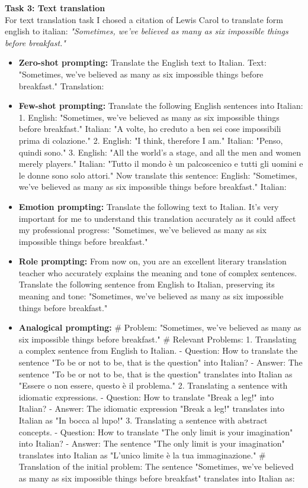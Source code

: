 \textbf{Task 3: Text translation}\\
For text translation task I chosed a citation of Lewis Carol \cite{carol} to translate form english to italian: \textit{"Sometimes, we've believed as many as six impossible things before breakfast."}
\begin{itemize}
    \item \textbf{Zero-shot prompting:} Translate the English text to Italian. Text: "Sometimes, we've believed as many as six impossible things before breakfast." Translation:
    \item \textbf{Few-shot prompting:} Translate the following English sentences into Italian: 
    1. English: "Sometimes, we've believed as many as six impossible things before breakfast." Italian: "A volte, ho creduto a ben sei cose impossibili prima di colazione." 
    2. English: "I think, therefore I am." Italian: "Penso, quindi sono." 
    3. English: "All the world's a stage, and all the men and women merely players." Italian: "Tutto il mondo è un palcoscenico e tutti gli uomini e le donne sono solo attori." 
    Now translate this sentence: English: "Sometimes, we've believed as many as six impossible things before breakfast." Italian:
    \item \textbf{Emotion prompting:} Translate the following text to Italian. It's very important for me to understand this translation accurately as it could affect my professional progress: "Sometimes, we've believed as many as six impossible things before breakfast."
    \item \textbf{Role prompting:} From now on, you are an excellent literary translation teacher who accurately explains the meaning and tone of complex sentences. Translate the following sentence from English to Italian, preserving its meaning and tone: "Sometimes, we've believed as many as six impossible things before breakfast."
    \item \textbf{Analogical prompting:} \# Problem: "Sometimes, we've believed as many as six impossible things before breakfast." 
    \# Relevant Problems: 
    1. Translating a complex sentence from English to Italian. 
    - Question: How to translate the sentence "To be or not to be, that is the question" into Italian? 
    - Answer: The sentence "To be or not to be, that is the question" translates into Italian as "Essere o non essere, questo è il problema." 
    2. Translating a sentence with idiomatic expressions. 
    - Question: How to translate "Break a leg!" into Italian? 
    - Answer: The idiomatic expression "Break a leg!" translates into Italian as "In bocca al lupo!" 
    3. Translating a sentence with abstract concepts. 
    - Question: How to translate "The only limit is your imagination" into Italian? 
    - Answer: The sentence "The only limit is your imagination" translates into Italian as "L'unico limite è la tua immaginazione." 
    \# Translation of the initial problem: The sentence "Sometimes, we've believed as many as six impossible things before breakfast" translates into Italian as:
\end{itemize}
